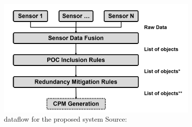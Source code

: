 \begin{figure}[ht!]
    \centering
    \includegraphics[width=10cm]{FIGURES/Fig12.png}
    \caption{dataflow for the proposed system Source: \cite{Delooz2022}}
    \label{fig:Del}
\end{figure}


